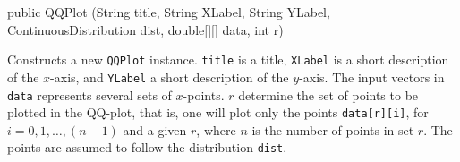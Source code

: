 \begin{htmlonly}
\end{htmlonly}
\begin{code}

   public QQPlot (String title, String XLabel, String YLabel,
                  ContinuousDistribution dist, double[][] data, int r) \begin{hide} {
      this (title, XLabel, YLabel, dist, data[r], data[r].length);
   }
}\end{hide}
\end{code}
\begin{tabb}
   Constructs a new \texttt{QQPlot} instance.
   \texttt{title} is a title, \texttt{XLabel} is a short description of
   the $x$-axis, and \texttt{YLabel}  a short description of the $y$-axis.
   The input vectors in \texttt{data} represents several sets of $x$-points.
   $r$ determine the set of points to be plotted in the QQ-plot, that is,
   one will plot only the points \texttt{data[r][i]},
   for $i=0, 1, \ldots, (n-1)$ and a given $r$, where $n$ is the number
   of points in set $r$. The points are assumed to follow the distribution
  \texttt{dist}.
\end{tabb}
\begin{htmlonly}
\end{htmlonly}
